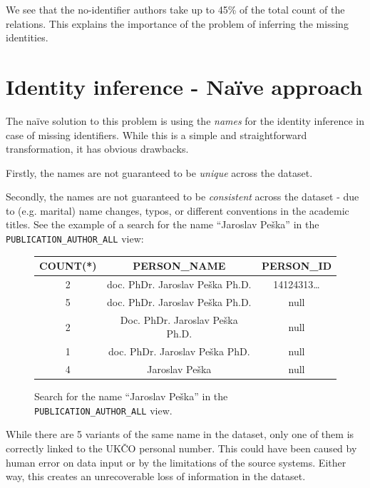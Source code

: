 We see that the no-identifier authors take up to 45\% of the total count of the relations.
This explains the importance of the problem of inferring the missing identities.

\section{Identity inference - Naïve approach}\label{sec:naive-approach}

The naïve solution to this problem is using the \textit{names} for the identity inference 
in case of missing identifiers.
While this is a simple and straightforward transformation, it has obvious drawbacks.

Firstly, the names are not guaranteed to be \textit{unique} across the dataset. 

Secondly, the names are not guaranteed to be \textit{consistent} across the dataset - due to (e.g. marital) name changes, 
typos, or different conventions in the academic titles.
See the example of a search for the name ``Jaroslav Peška'' in the \texttt{PUBLICATION\_AUTHOR\_ALL} view:

\begin{figure}[!ht]\label{fig:jaroslav-peska}
    \captionsetup{width=.9\linewidth}
    \centering
    \begin{tabular}{|c|c|c|}
    \hline
        COUNT(*) & PERSON\_NAME & PERSON\_ID \\ \hline
        2 & doc. PhDr. Jaroslav Peška Ph.D. & 14124313\dots \footnotemark \\ \hline
        5 & doc. PhDr. Jaroslav Peška Ph.D. & null \\ \hline
        2 & Doc. PhDr. Jaroslav Peška Ph.D. & null \\ \hline
        1 & doc. PhDr. Jaroslav Peška PhD. & null \\ \hline
        4 & Jaroslav Peška & null \\ \hline
    \end{tabular}
    \caption{Search for the name ``Jaroslav Peška'' in the \texttt{PUBLICATION\_AUTHOR\_ALL} view.}
\end{figure}


    While there are 5 variants of the same name in the dataset, only one of them is correctly linked to the \ac{UKČO} personal number.
This could have been caused by human error on data input or by the limitations of the source systems. 
Either way, this creates an unrecoverable loss of information in the dataset.

